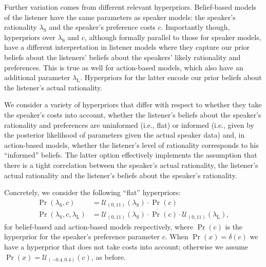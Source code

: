 Further variation comes from different relevant
hyperpriors. Belief-based models of the listener have the same
parameters as speaker models: the speaker's rationality
$\lambda_\mathrm{S}$ and the speaker's preference costs
$c$. Importantly though, hyperpriors over $\lambda_\mathrm{S}$ and
$c$, although formally parallel to those for speaker models, have a
different interpretation in listener models where they capture our
prior beliefs about the listeners' beliefs about the speakers' likely
rationality and preferences. This is true as well for action-based
models, which also have an additional parameter
$\lambda_\mathrm{L}$. Hyperpriors for the latter encode our prior
beliefs about the listener's actual rationality.

We consider a variety of hyperpriors that differ with respect to
whether they take the speaker's costs into account, whether the
listener's beliefs about the speaker's rationality and preferences are
uninformed (i.e., flat) or informed (i.e., given by the posterior
likelihood of parameters given the actual speaker data) and, in
action-based models, whether the listener's level of rationality
corresponds to his ``informed'' beliefs. The latter option effectively
implements the assumption that there is a tight correlation between
the speaker's actual rationality, the listener's actual rationality
and the listener's beliefs about the speaker's rationality.

Concretely, we consider the following ``flat'' hyperpriors:
\begin{align*}
  \Pr(\lambda_\mathrm{S},c) & =
  \mathcal{U}_{(0,11)}(\lambda_\mathrm{S}) \cdot
  \Pr(c) \\
  \Pr(\lambda_\mathrm{S},c,\lambda_\mathrm{L}) & = 
  \mathcal{U}_{(0,11)}(\lambda_\mathrm{S}) \cdot
    \Pr(c) \cdot  \mathcal{U}_{(0,11)}(
    \lambda_\mathrm{L}),
\end{align*}
for belief-based and action-based models respectively, where $\Pr(c)$
is the hyperprior for the speaker's preference parameter $c$. When
$\Pr(x) = \delta(c)$ we have a hyperprior that does not take costs
into account; otherwise we assume $\Pr(x) =
\mathcal{U}_{(-0.4,0.4)}(c)$, as before.

